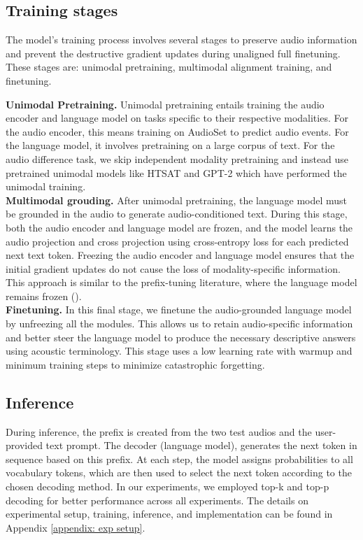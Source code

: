 \subsection{Training stages} \label{subsec: training stages} \vspace{-0.1in}
The model’s training process involves several stages to preserve audio information and prevent the destructive gradient updates  during unaligned full finetuning. These stages are: unimodal pretraining, multimodal alignment training, and finetuning.

\noindent \textbf{Unimodal Pretraining.} Unimodal pretraining entails training the audio encoder and language model on tasks specific to their respective modalities. For the audio encoder, this means training on AudioSet to predict audio events. For the language model, it involves pretraining on a large corpus of text. For the audio difference task, we skip independent modality pretraining and instead use pretrained unimodal models like HTSAT and GPT-2 which have performed the unimodal training.\\
\textbf{Multimodal grouding.} After unimodal pretraining, the language model must be grounded in the audio to generate audio-conditioned text. During this stage, both the audio encoder and language model are frozen, and the model learns the audio projection and cross projection using cross-entropy loss for each predicted next text token. Freezing the audio encoder and language model ensures that the initial gradient updates do not cause the loss of modality-specific information. This approach is similar to the prefix-tuning literature, where the language model remains frozen (\cite{mspengi,mokady2021clipcap}).\\
\textbf{Finetuning.} In this final stage, we finetune the audio-grounded language model by unfreezing all the modules. This allows us to retain audio-specific information and better steer the language model to produce the necessary descriptive answers using acoustic terminology. This stage uses a low learning rate with warmup and minimum training steps to minimize catastrophic forgetting.

 \vspace{-0.1in}
\subsection{Inference} \label{subsec: inference} \vspace{-0.1in}
During inference, the prefix is created from the two test audios and the user-provided text prompt. The decoder (language model), generates the next token in sequence based on this prefix. At each step, the model assigns probabilities to all vocabulary tokens, which are then used to select the next token according to the chosen decoding method. In our experiments, we employed top-k and top-p decoding for better performance across all experiments. The details on experimental setup, training, inference, and implementation can be found in Appendix \ref{appendix: exp setup}.
